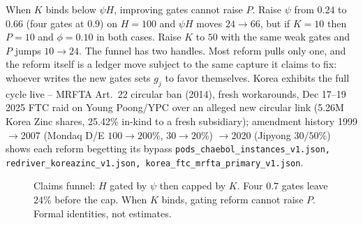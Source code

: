 When $K$ binds below $\psi H$, improving gates cannot raise $P$. Raise $\psi$ from $0.24$ to $0.66$ (four gates at $0.9$) on $H=100$ and $\psi H$ moves $24\to66$, but if $K=10$ then $P=10$ and $\phi=0.10$ in both cases. Raise $K$ to $50$ with the same weak gates and $P$ jumps $10\to24$. The funnel has two handles. Most reform pulls only one, and the reform itself is a ledger move subject to the same capture it claims to fix: whoever writes the new gates sets $g_j$ to favor themselves. Korea exhibits the full cycle live -- MRFTA Art.~22 circular ban (2014), fresh workarounds, Dec 17--19 2025 FTC raid on Young Poong/YPC over an alleged new circular link (5.26M Korea Zinc shares, 25.42\% in-kind to a fresh subsidiary); amendment history 1999$\to$2007 (Mondaq D/E $100\to200\%$, $30\to20\%$) $\to$2020 (Jipyong $30/50\%$) shows each reform begetting its bypass \texttt{pods\_chaebol\_instances\_v1.json, redriver\_koreazinc\_v1.json, korea\_ftc\_mrfta\_primary\_v1.json}.

\begin{figure}[h]
\centering
{}
\caption{Claims funnel: $H$ gated by $\psi$ then capped by $K$. Four $0.7$ gates leave $24\%$ before the cap. When $K$ binds, gating reform cannot raise $P$. Formal identities, not estimates.}
\label{fig:funnel5}
\end{figure}

